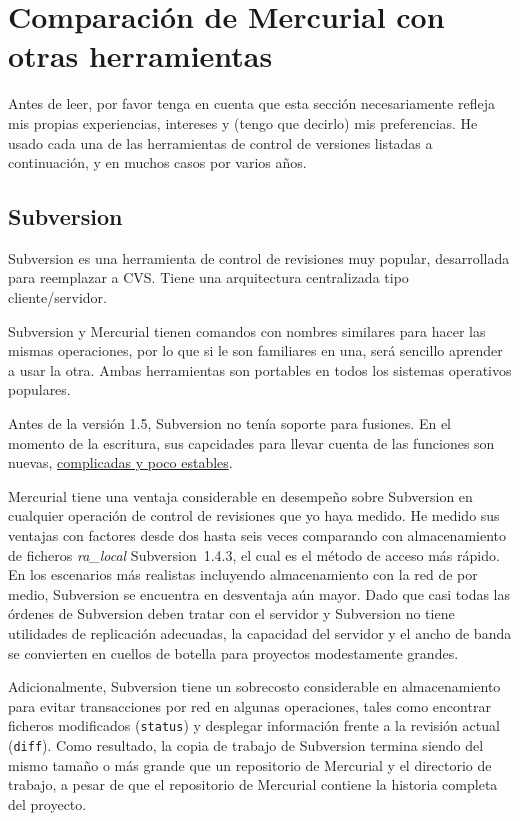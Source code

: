 \section{Comparación de Mercurial con otras herramientas}

Antes de leer, por favor tenga en cuenta que esta sección
necesariamente refleja mis propias experiencias, intereses y (tengo que
decirlo) mis preferencias. He usado cada una de las herramientas de
control de versiones listadas a continuación, y en muchos casos por
varios años.


\subsection{Subversion}

Subversion es una herramienta de control de revisiones muy popular,
desarrollada para reemplazar a CVS.  Tiene una arquitectura
centralizada tipo cliente/servidor.

Subversion y Mercurial tienen comandos con nombres similares para hacer
las mismas operaciones, por lo que si le son familiares en una, será
sencillo aprender a usar la otra. Ambas herramientas son portables en
todos los sistemas operativos populares.

Antes de la versión 1.5, Subversion no tenía soporte para fusiones. En
el momento de la escritura, sus capcidades para llevar cuenta de las
funciones son nuevas,
\href{http://svnbook.red-bean.com/nightly/en/svn.branchmerge.advanced.html#svn.branchmerge.advanced.finalword}{complicadas
  y poco estables}.

Mercurial tiene una ventaja considerable en desempeño sobre
Subversion en cualquier operación de control de revisiones que yo haya
medido. He medido sus ventajas con factores desde dos hasta seis veces
comparando con almacenamiento de ficheros \emph{ra\_local}
Subversion~1.4.3, el cual es el método de acceso más rápido.  En los
escenarios más realistas incluyendo almacenamiento con la red de por
medio, Subversion se encuentra en desventaja aún mayor. Dado que casi
todas las órdenes de Subversion deben tratar con el servidor y
Subversion no tiene utilidades de replicación adecuadas, la capacidad
del servidor y el ancho de banda se convierten en cuellos de botella
para proyectos modestamente grandes.

Adicionalmente, Subversion tiene un sobrecosto considerable en
almacenamiento para evitar transacciones por red en algunas
operaciones,
tales como encontrar ficheros modificados (\texttt{status}) y desplegar
información frente a la revisión actual (\texttt{diff}).  Como
resultado, la copia de trabajo de Subversion termina siendo del mismo
tamaño o más grande que un repositorio de Mercurial y el directorio de
trabajo, a pesar de que el repositorio de Mercurial contiene la
historia completa  del proyecto.

